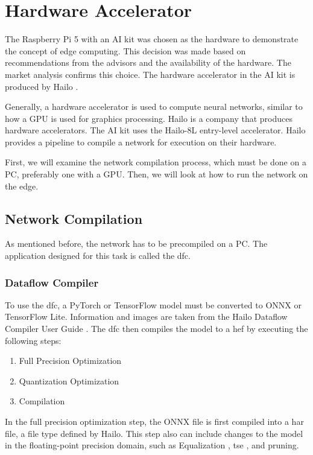 \chapter{Hardware Accelerator}

The Raspberry Pi 5 with an AI kit was chosen as the hardware to demonstrate the concept of edge computing.  
This decision was made based on recommendations from the advisors and the availability of the hardware.  
The market analysis confirms this choice.  
The hardware accelerator in the AI kit is produced by Hailo \cite{hailo}.  

Generally, a hardware accelerator is used to compute neural networks, similar to how a GPU is used for graphics processing.  
Hailo is a company that produces hardware accelerators.  
The AI kit uses the Hailo-8L entry-level accelerator.  
Hailo provides a pipeline to compile a network for execution on their hardware.  

First, we will examine the network compilation process, which must be done on a PC, preferably one with a GPU.  
Then, we will look at how to run the network on the edge.  

\section{Network Compilation}

As mentioned before, the network has to be precompiled on a PC.  
The application designed for this task is called the \Acrfull{dfc}.  

\subsection{Dataflow Compiler  
\label{section:dfc}}  

To use the \acrshort{dfc}, a PyTorch or TensorFlow model must be converted to ONNX or TensorFlow Lite.  
Information and images are taken from the Hailo Dataflow Compiler User Guide \cite{hailo_dataflow_compiler}.  
The \acrshort{dfc} then compiles the model to a \Acrfull{hef} by executing the following steps:  

\begin{enumerate}
    \item Full Precision Optimization
    \item Quantization Optimization
    \item Compilation
\end{enumerate}

In the full precision optimization step, the ONNX file is first compiled into a \acrfull{har} file, a file type defined by Hailo.  
This step also can include changes to the model in the floating-point precision domain, such as Equalization \cite{meller2019same}, \acrshort{tse} \cite{Vosco_2021_ICCV}, and pruning.  

